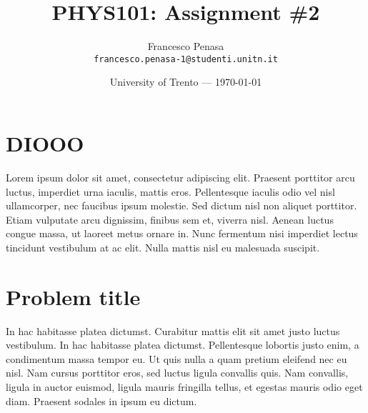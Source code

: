 \documentclass{article}
\title{PHYS101: Assignment \#2} %
\author{Francesco Penasa\\ \texttt{francesco.penasa-1@studenti.unitn.it}} %
\date{University of Trento --- \today} %
\begin{document}
	
\maketitle %
	
	
\section*{DIOOO} %
	
Lorem ipsum dolor sit amet, consectetur adipiscing elit. Praesent porttitor arcu luctus, imperdiet urna iaculis, mattis eros. Pellentesque iaculis odio vel nisl ullamcorper, nec faucibus ipsum molestie. Sed dictum nisl non aliquet porttitor. Etiam vulputate arcu dignissim, finibus sem et, viverra nisl. Aenean luctus congue massa, ut laoreet metus ornare in. Nunc fermentum nisi imperdiet lectus tincidunt vestibulum at ac elit. Nulla mattis nisl eu malesuada suscipit.
	
\section{Problem title} %
	
In hac habitasse platea dictumst. Curabitur mattis elit sit amet justo luctus vestibulum. In hac habitasse platea dictumst. Pellentesque lobortis justo enim, a condimentum massa tempor eu. Ut quis nulla a quam pretium eleifend nec eu nisl. Nam cursus porttitor eros, sed luctus ligula convallis quis. Nam convallis, ligula in auctor euismod, ligula mauris fringilla tellus, et egestas mauris odio eget diam. Praesent sodales in ipsum eu dictum.
	
\end{document}
